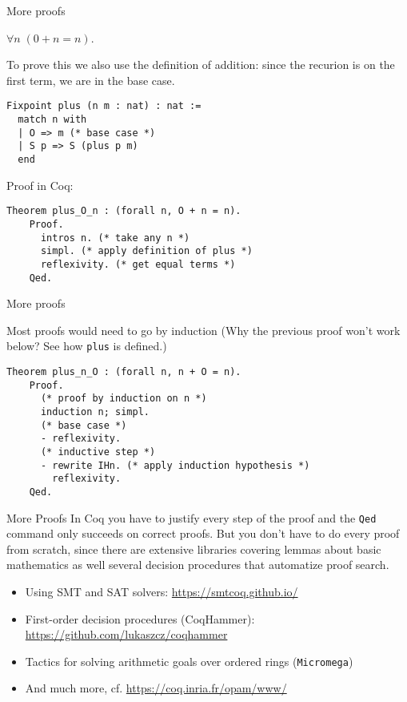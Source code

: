\documentclass[10pt]{beamer}
\begin{document}
\begin{frame}[fragile]{More proofs}
\begin{theorem} $\forall n \; (0 + n = n)$.
\end{theorem}

To prove this we also use the definition of addition: since the recurion is on the first term, we are in the base case.

   \begin{lstlisting}[language=Coq]
  Fixpoint plus (n m : nat) : nat :=
  match n with
  | O => m (* base case *)
  | S p => S (plus p m)
  end
   \end{lstlisting}

   Proof in Coq:

  \begin{lstlisting}[language=Coq]
    Theorem plus_O_n : (forall n, O + n = n).
    Proof.
      intros n. (* take any n *)
      simpl. (* apply definition of plus *)
      reflexivity. (* get equal terms *)
    Qed.
  \end{lstlisting}

 
\end{frame}



\begin{frame}[fragile]{More proofs}

  Most proofs would need to go by induction (Why the previous proof won't work below? See how \texttt{plus} is defined.)

  \begin{lstlisting}[language=Coq]
    Theorem plus_n_O : (forall n, n + O = n).
    Proof.
      (* proof by induction on n *)
      induction n; simpl.
      (* base case *)
      - reflexivity.
      (* inductive step *)
      - rewrite IHn. (* apply induction hypothesis *)
        reflexivity.
    Qed.

  \end{lstlisting}
\end{frame}
\begin{frame}{More Proofs}
     In Coq you have to justify every step of the proof and the \texttt{Qed} command only succeeds on correct proofs. But you don't have to do every proof from scratch, since there are extensive libraries covering lemmas about basic mathematics as well several decision procedures that automatize proof search.
     \begin{itemize}
     \item Using SMT and SAT solvers: \url{https://smtcoq.github.io/}
     \item First-order decision procedures (CoqHammer): \url{https://github.com/lukaszcz/coqhammer}
     \item Tactics for solving arithmetic goals over ordered rings (\texttt{Micromega})
       \item And much more, cf. \url{https://coq.inria.fr/opam/www/}
       \end{itemize}
  
\end{frame}
\end{document}
